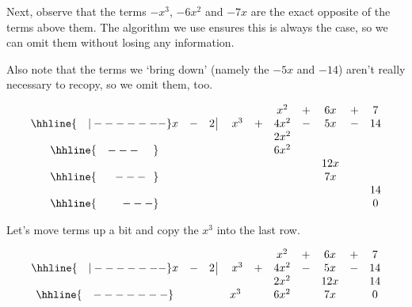 \documentclass{ximera}
\begin{document}
\setlength\arraycolsep{5pt}
\setlength\extrarowheight{0pt}


Next, observe that the terms $-x^3$, $-6x^2$ and $-7x$ are the exact opposite of the terms above them.  The algorithm we use ensures this is always the case, so we can omit them without losing any information.

\medskip

 Also note that the terms we `bring down' (namely the $-5x$ and $-14$) aren't really necessary to recopy, so we omit them, too.


\setlength\arraycolsep{0.1pt}
\setlength\extrarowheight{2pt}

\[ \begin{array}{cccccccccc}

& & & & & x^2 & + & 6x & + & 7 \\ \hhline{~~~|-------}

x & - & 2 \, \vline& \, \, x^3 & + & 4x^2 & - & 5x & - & 14 \\

 &  &  &   &  &   2x^2 &  &  &  &  \\ \hhline{~~~---~~~~} 
 &  &  &   &  & 6 x^2 &  &  &  &  \\ 
 &  &  &   & &  &  &  12x &  &  \\ \hhline{~~~~~---~~} 
 &  &  &   &   &  & & 7x  &  &  \\
 &  &  &   &   &  & &   &  &  14  \\ \hhline{~~~~~~~---} 
 &   &  &  &  &  &  &  &  & 0
 
\end{array}\]

\setlength\arraycolsep{5pt}
\setlength\extrarowheight{0pt}

Let's move terms up a bit and copy the $x^3$ into the last row.


\setlength\arraycolsep{0.1pt}
\setlength\extrarowheight{2pt}

\[ \begin{array}{cccccccccc}

& & & & & x^2 & + & 6x & + & 7 \\ \hhline{~~~|-------}

x & - & 2 \, \vline& \, \, x^3 & + & 4x^2 & - & 5x & - & 14 \\

 &  &  &   & &   2x^2 &  & 12x &  & 14 \\ \hhline{~~~-------} 
 &  &  & x^3  &  & 6 x^2 &  & 7x &  &0  \\  
\end{array}\]
\end{document}
